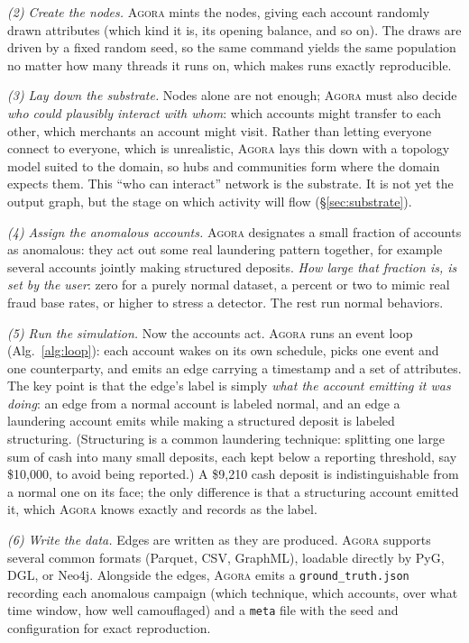 \documentclass[sigconf,review,anonymous]{acmart}
\newcommand{\sys}{\textsc{Agora}\xspace}
\begin{document}
\emph{(2) Create the nodes.} \sys{} mints the nodes, giving each account randomly drawn
attributes (which kind it is, its opening balance, and so on). The draws are driven by
a fixed random seed, so the same command yields the same population no matter how many
threads it runs on, which makes runs exactly reproducible.

\emph{(3) Lay down the substrate.} Nodes alone are not enough; \sys{} must also decide
\emph{who could plausibly interact with whom}: which accounts might transfer to each
other, which merchants an account might visit. Rather than letting everyone connect to
everyone, which is unrealistic, \sys{} lays this down with a topology model suited to the
domain, so hubs and communities form where the domain expects them. This ``who can
interact'' network is the substrate. It is not yet the output graph, but the stage on
which activity will flow (\S\ref{sec:substrate}).

\emph{(4) Assign the anomalous accounts.} \sys{} designates a small fraction of
accounts as anomalous: they act out some real laundering pattern together, for example
several accounts jointly making structured deposits. \emph{How large that fraction is,
is set by the user}: zero for a purely normal dataset, a percent or two to mimic real
fraud base rates, or higher to stress a detector. The rest run normal behaviors.

\emph{(5) Run the simulation.} Now the accounts act. \sys{} runs an event loop
(Alg.~\ref{alg:loop}): each account wakes on its own schedule, picks one event and one
counterparty, and emits an edge carrying a timestamp and a set of attributes. The key
point is that the edge's label is simply \emph{what the account emitting it was doing}:
an edge from a normal account is labeled \textsf{normal}, and an edge a laundering
account emits while making a structured deposit is labeled \textsf{structuring}.
(Structuring is a common laundering technique: splitting one large sum of cash into many
small deposits, each kept below a reporting threshold, say \$10{,}000, to avoid being
reported.) A \$9{,}210 cash deposit is indistinguishable from a normal one on its face;
the only difference is that a structuring account emitted it, which \sys{} knows exactly
and records as the label.

\emph{(6) Write the data.} Edges are written as they are produced. \sys{} supports
several common formats (Parquet, CSV, GraphML), loadable directly by PyG, DGL, or
Neo4j. Alongside the edges, \sys{} emits a \texttt{ground\_truth.json} recording each
anomalous campaign (which technique, which accounts, over what time window, how well
camouflaged) and a \texttt{meta} file with the seed and configuration for exact
reproduction.
\end{document}
